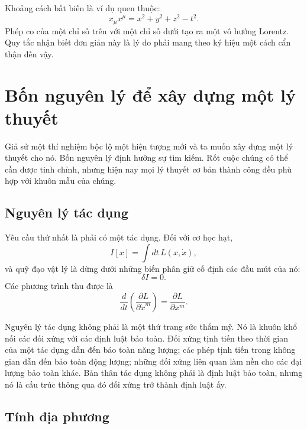 Khoảng cách bất biến là ví dụ quen thuộc:
\begin{equation}
x_\mu x^\mu
=
x^2+y^2+z^2-t^2.
\label{eq:sr7-interval}
\end{equation}
Phép co của một chỉ số trên với một chỉ số dưới tạo ra một vô hướng Lorentz. Quy tắc nhận biết đơn giản này là lý do phải mang theo ký hiệu một cách cẩn thận đến vậy.

\section{Bốn nguyên lý để xây dựng một lý thuyết}

Giả sử một thí nghiệm bộc lộ một hiện tượng mới và ta muốn xây dựng một lý thuyết cho nó. Bốn nguyên lý định hướng sự tìm kiếm. Rốt cuộc chúng có thể cần được tinh chỉnh, nhưng hiện nay mọi lý thuyết cơ bản thành công đều phù hợp với khuôn mẫu của chúng.

\subsection{Nguyên lý tác dụng}

Yêu cầu thứ nhất là phải có một tác dụng. Đối với cơ học hạt,
\begin{equation}
I[x]
=
\int dt\,L(x,\dot x),
\label{eq:sr7-particle-action-general}
\end{equation}
và quỹ đạo vật lý là dừng dưới những biến phân giữ cố định các đầu mút của nó:
\begin{equation}
\delta I=0.
\end{equation}
Các phương trình thu được là
\begin{equation}
\frac{d}{dt}
\left(
\frac{\partial L}{\partial\dot x^m}
\right)
=
\frac{\partial L}{\partial x^m}.
\label{eq:sr7-EL}
\end{equation}

Nguyên lý tác dụng không phải là một thứ trang sức thẩm mỹ. Nó là khuôn khổ nối các đối xứng với các định luật bảo toàn. Đối xứng tịnh tiến theo thời gian của một tác dụng dẫn đến bảo toàn năng lượng; các phép tịnh tiến trong không gian dẫn đến bảo toàn động lượng; những đối xứng liên quan làm nền cho các đại lượng bảo toàn khác. Bản thân tác dụng không phải là định luật bảo toàn, nhưng nó là cấu trúc thông qua đó đối xứng trở thành định luật ấy.

\subsection{Tính địa phương}

